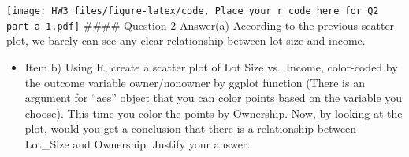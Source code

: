 \documentclass[
]{article}
\newenvironment{Shaded}{\begin{snugshade}}{\end{snugshade}}
\newcommand{\AttributeTok}[1]{\textcolor[rgb]{0.77,0.63,0.00}{#1}}
\newcommand{\DecValTok}[1]{\textcolor[rgb]{0.00,0.00,0.81}{#1}}
\newcommand{\FunctionTok}[1]{\textcolor[rgb]{0.00,0.00,0.00}{#1}}
\newcommand{\NormalTok}[1]{#1}
\newcommand{\OtherTok}[1]{\textcolor[rgb]{0.56,0.35,0.01}{#1}}
\newcommand{\SpecialCharTok}[1]{\textcolor[rgb]{0.00,0.00,0.00}{#1}}
\newcommand{\StringTok}[1]{\textcolor[rgb]{0.31,0.60,0.02}{#1}}
\providecommand{\tightlist}{%
  \setlength{\itemsep}{0pt}\setlength{\parskip}{0pt}}
\begin{document}
\begin{Shaded}
\end{Shaded}

\texttt{[image: HW3\_files/figure-latex/code, Place your r code here for Q2 part a-1.pdf]}
\#\#\#\# Question 2 Answer(a) According to the previous scatter plot, we
barely can see any clear relationship between lot size and income.

\begin{itemize}
\tightlist
\item
  Item b) Using R, create a scatter plot of Lot Size vs.~Income,
  color-coded by the outcome variable owner/nonowner by ggplot function
  (There is an argument for ``aes'' object that you can color points
  based on the variable you choose). This time you color the points by
  Ownership. Now, by looking at the plot, would you get a conclusion
  that there is a relationship between Lot\_Size and Ownership. Justify
  your answer.
\end{itemize}

\begin{Shaded}
\end{Shaded}
\end{document}
